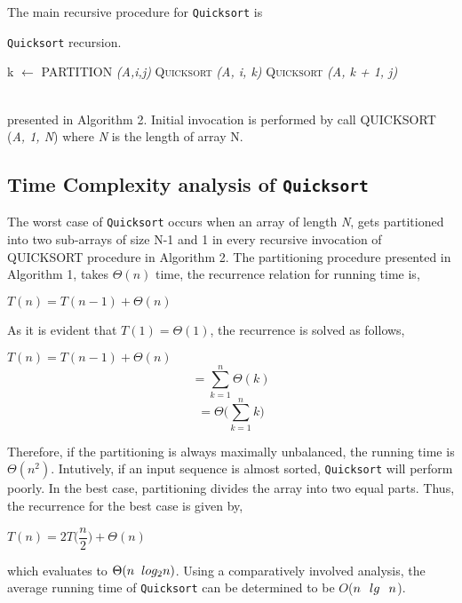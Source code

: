 \documentclass[a4paper, 10pt,twocolumn]{article}
\begin{document}
The main recursive procedure for \texttt{Quicksort} is\\
\begin{algorithm}
  \caption{\texttt{Quicksort} recursion.}
  \label{algo:ins_sort1}
  \begin{algorithmic}[1]
     \newline
            \State k $\leftarrow$ PARTITION \textit{(A,i,j)}
            \State \textsc{Quicksort} \textit{(A, i, k)}
            \State \textsc{Quicksort} \textit{(A, k + 1, j)}
         \EndIf
     \EndProcedure 
  \end{algorithmic}
\end{algorithm}\\
presented in Algorithm 2. Initial invocation is performed by call QUICKSORT (\textit{A, 1, N}) where \textit{N} is the length of array N.      
   
\subsection{Time Complexity analysis of \texttt{Quicksort}}
The worst case of \texttt{Quicksort} occurs when an array of length \textit{N}, gets partitioned into two sub-arrays of size N-1 and 1 in every recursive invocation of QUICKSORT procedure in Algorithm 2. The partitioning procedure presented in Algorithm 1, takes $\Theta(n)$ time, the recurrence relation for running time is,
\begin{center}
$T (n) = T (n - 1) +	\Theta(n)$    
\end{center}
As it is evident that $T(1) = \Theta(1)$, the recurrence is solved as follows,
\begin{center}
$T (n) = T (n - 1) +	\Theta(n)$    
$$=\sum_{k=1}^{n} \Theta(k)$$
$$=\Theta\Bigg(\sum_{k=1}^{n}k\Bigg)$$
\end{center}

Therefore, if the partitioning is always maximally unbalanced, the running time is $\Theta(n^{2})$. Intutively, if an input sequence is almost sorted, \texttt{Quicksort} will perform poorly. In the best case, partitioning divides the array into two equal parts. Thus, the recurrence for the best case is given by,
\begin{center}
$T (n) = 2T \bigg({\dfrac{n}{2}}\bigg) +	\Theta(n)$    
\end{center}
which evaluates to $\Theta(n\hspace{.2cm}log_{2} n)$. Using a comparatively involved analysis, the average running time of \texttt{Quicksort} can be determined to be $O$($n\hspace{.25cm}lg\hspace{.25cm}n$).
\end{document}
